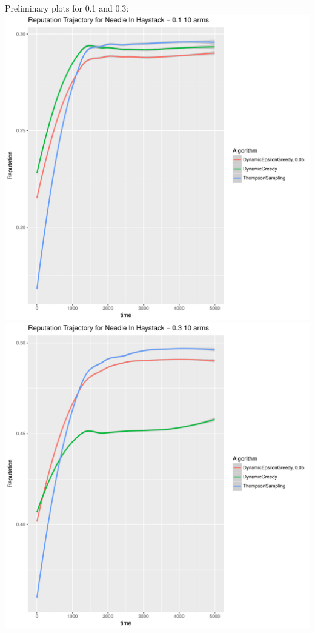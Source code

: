 \documentclass[11pt,letterpaper]{article}
\begin{document}
Preliminary plots for 0.1 and 0.3: \\
\includegraphics[scale=0.4]{"./Reputation Trajectory for Needle In Haystack 1 10 arms"} \\
\includegraphics[scale=0.4]{"./Reputation Trajectory for Needle In Haystack 3 10 arms"}


\end{document}
